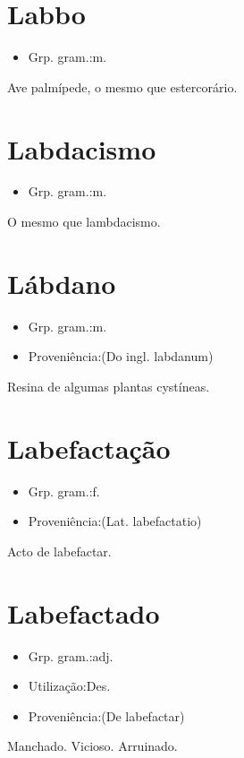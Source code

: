 \section{Labbo}
\begin{itemize}
\item {Grp. gram.:m.}
\end{itemize}
Ave palmípede, o mesmo que \textunderscore estercorário\textunderscore .
\section{Labdacismo}
\begin{itemize}
\item {Grp. gram.:m.}
\end{itemize}
O mesmo que \textunderscore lambdacismo\textunderscore .
\section{Lábdano}
\begin{itemize}
\item {Grp. gram.:m.}
\end{itemize}
\begin{itemize}
\item {Proveniência:(Do ingl. \textunderscore labdanum\textunderscore )}
\end{itemize}
Resina de algumas plantas cystíneas.
\section{Labefactação}
\begin{itemize}
\item {Grp. gram.:f.}
\end{itemize}
\begin{itemize}
\item {Proveniência:(Lat. \textunderscore labefactatio\textunderscore )}
\end{itemize}
Acto de labefactar.
\section{Labefactado}
\begin{itemize}
\item {Grp. gram.:adj.}
\end{itemize}
\begin{itemize}
\item {Utilização:Des.}
\end{itemize}
\begin{itemize}
\item {Proveniência:(De \textunderscore labefactar\textunderscore )}
\end{itemize}
Manchado.
Vicioso.
Arruinado.
